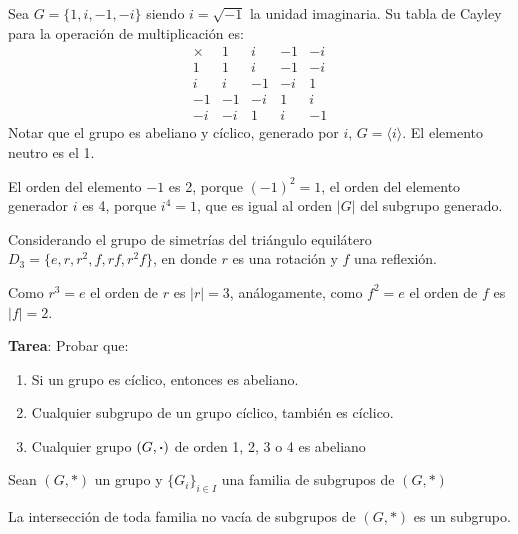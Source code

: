 	\begin{fmd-example}
		Sea $G = \{ 1, i, -1, -i \}$ siendo $i = \sqrt{-1}$ la unidad imaginaria. Su tabla de Cayley para la operación de multiplicación es:
		\[ \begin{array}{r|rrrr}
			\times & 1 & i & -1 & -i\\ \hline
			1 & 1 & i & -1 & -i\\
			i & i & -1 & -i & 1\\
			-1 & -1 & -i & 1 & i\\
			-i & -i & 1 & i & -1 
		\end{array} \]
		Notar que el grupo es abeliano y cíclico, generado por $i$, $G = \langle i \rangle$. El elemento neutro es el 1.
		
		El orden del elemento $-1$ es 2, porque $(-1)^2 = 1$, el orden del elemento generador $i$ es 4, porque $i^4 = 1$, que es igual al orden $|G|$ del subgrupo generado.
	\end{fmd-example}
	
	\begin{fmd-example}
		Considerando el grupo de simetrías del triángulo equilátero $D_3 = \{ e, r, r^2, f, rf, r^2f \}$, en donde $r$ es una rotación y $f$ una reflexión.
		
		Como $r^3 = e$ el orden de $r$ es $|r| = 3$, análogamente, como $f^2 = e$ el orden de $f$ es $|f| = 2$.
	\end{fmd-example}
	
	\textbf{Tarea}: Probar que:
	\begin{enumerate}
		\item Si un grupo es cíclico, entonces es abeliano.
		\item Cualquier subgrupo de un  grupo cíclico, también es cíclico.
		\item Cualquier grupo $(G, \boldsymbol{\cdot})$ de orden 1, 2, 3 o 4 es abeliano
	\end{enumerate}

	Sean $(G, *)$ un grupo y $\{G_i\}_{i \in I}$ una familia de subgrupos de $(G, *)$
	\begin{fmd-theorem}
		La intersección de toda familia no vacía de subgrupos de $(G, *)$ es un subgrupo.
	\end{fmd-theorem}
	
